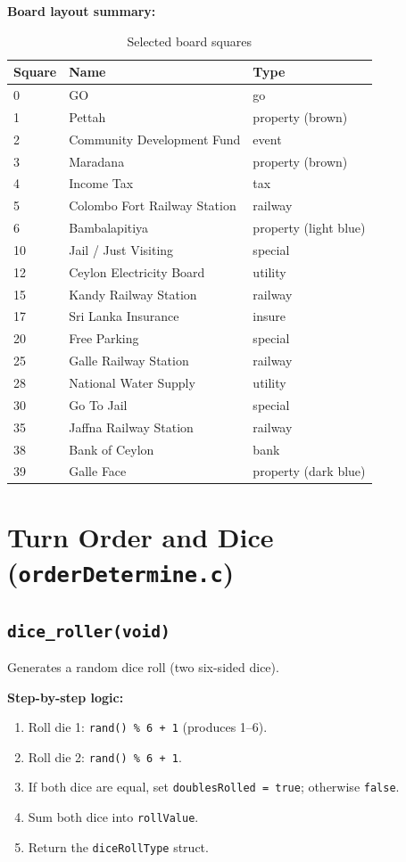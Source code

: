 \documentclass[12pt,a4paper]{article}
\begin{document}
\textbf{Board layout summary:}
\begin{table}[h]
\centering
\begin{tabular}{lll}
\toprule
Square & Name & Type \\
\midrule
0 & GO & go \\
1 & Pettah & property (brown) \\
2 & Community Development Fund & event \\
3 & Maradana & property (brown) \\
4 & Income Tax & tax \\
5 & Colombo Fort Railway Station & railway \\
6 & Bambalapitiya & property (light blue) \\
10 & Jail / Just Visiting & special \\
12 & Ceylon Electricity Board & utility \\
15 & Kandy Railway Station & railway \\
17 & Sri Lanka Insurance & insure \\
20 & Free Parking & special \\
25 & Galle Railway Station & railway \\
28 & National Water Supply & utility \\
30 & Go To Jail & special \\
35 & Jaffna Railway Station & railway \\
38 & Bank of Ceylon & bank \\
39 & Galle Face & property (dark blue) \\
\bottomrule
\end{tabular}
\caption{Selected board squares}
\end{table}

\newpage

\section{Turn Order and Dice (\texttt{orderDetermine.c})}

\subsection{\texttt{dice\_roller(void)}}
Generates a random dice roll (two six-sided dice).

\textbf{Step-by-step logic:}
\begin{enumerate}[noitemsep]
    \item Roll die 1: \texttt{rand() \% 6 + 1} (produces 1--6).
    \item Roll die 2: \texttt{rand() \% 6 + 1}.
    \item If both dice are equal, set \texttt{doublesRolled = true}; otherwise \texttt{false}.
    \item Sum both dice into \texttt{rollValue}.
    \item Return the \texttt{diceRollType} struct.
\end{enumerate}
\end{document}
